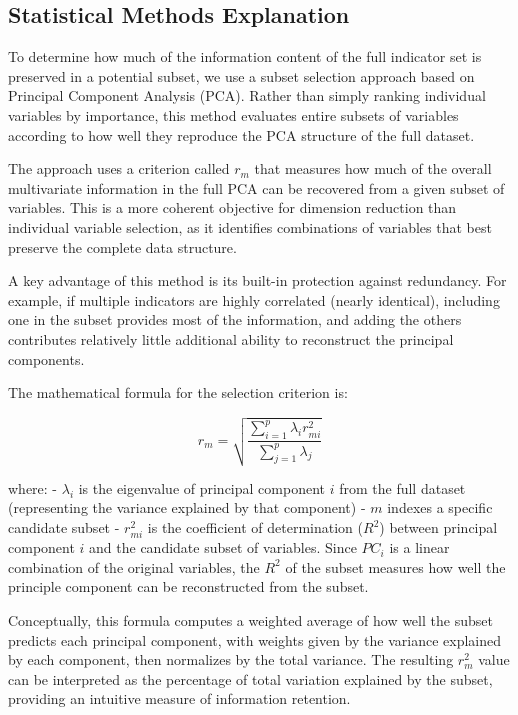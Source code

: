 \documentclass[
  letterpaper,
  DIV=11,
  numbers=noendperiod]{scrartcl}
\begin{document}
\subsection{Statistical Methods
Explanation}\label{statistical-methods-explanation}

To determine how much of the information content of the full indicator
set is preserved in a potential subset, we use a subset selection
approach based on Principal Component Analysis (PCA). Rather than simply
ranking individual variables by importance, this method evaluates entire
subsets of variables according to how well they reproduce the PCA
structure of the full dataset.

The approach uses a criterion called \(r_m\) that measures how much of
the overall multivariate information in the full PCA can be recovered
from a given subset of variables. This is a more coherent objective for
dimension reduction than individual variable selection, as it identifies
combinations of variables that best preserve the complete data
structure.

A key advantage of this method is its built-in protection against
redundancy. For example, if multiple indicators are highly correlated
(nearly identical), including one in the subset provides most of the
information, and adding the others contributes relatively little
additional ability to reconstruct the principal components.

The mathematical formula for the selection criterion is:

\[ r_m = \sqrt{ \frac{\sum_{i=1}^{p}\lambda_i r_{mi}^2} {\sum_{j=1}^{p}\lambda_j} }\]

where: - \(\lambda_i\) is the eigenvalue of principal component \(i\)
from the full dataset (representing the variance explained by that
component) - \(m\) indexes a specific candidate subset - \(r_{mi}^2\) is
the coefficient of determination (\(R^2\)) between principal component
\(i\) and the candidate subset of variables. Since \(PC_{i}\) is a
linear combination of the original variables, the \(R^2\) of the subset
measures how well the principle component can be reconstructed from the
subset.

Conceptually, this formula computes a weighted average of how well the
subset predicts each principal component, with weights given by the
variance explained by each component, then normalizes by the total
variance. The resulting \(r_m^2\) value can be interpreted as the
percentage of total variation explained by the subset, providing an
intuitive measure of information retention.
\end{document}
